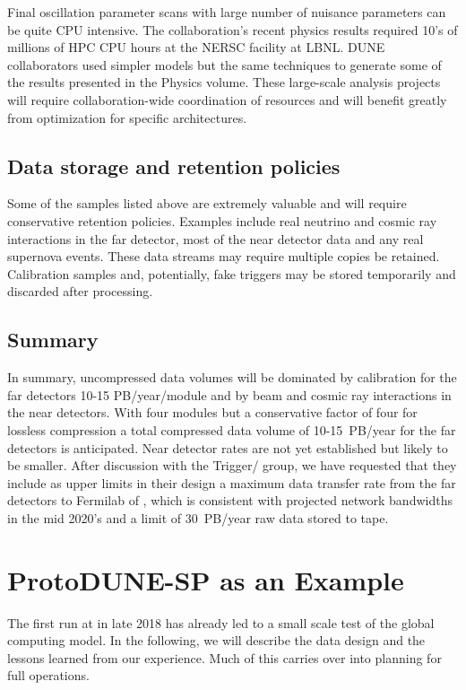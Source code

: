 Final oscillation parameter scans with large number of nuisance parameters can be quite CPU intensive.  The  collaboration's recent physics results required 10's of millions of  HPC CPU hours at the NERSC facility at LBNL. DUNE collaborators used simpler models but the same techniques to generate some of the results presented in the Physics volume. These large-scale analysis projects will require collaboration-wide coordination of resources and will benefit greatly from optimization for specific architectures.

\subsection{Data storage and retention policies}
Some of the samples listed above are extremely valuable and will require conservative retention policies.   Examples include real neutrino and cosmic ray interactions in the far detector, most of the near detector data and any real supernova events.  These data streams may require multiple copies be retained. Calibration samples and, potentially, fake  triggers may be stored temporarily and discarded after processing. 



\subsection{Summary}
In summary, uncompressed data volumes will be dominated by calibration for the far detectors 10-15 PB/year/module and by beam and cosmic ray interactions in the near detectors.  With four  modules but a conservative factor of four for lossless compression a total compressed data volume of 10-15~PB/year for the far detectors is anticipated. Near detector rates are not yet established but likely to be smaller.   
After discussion with the  Trigger/ group, we have requested that they include as upper limits in their design a  maximum data transfer rate from the far detectors to Fermilab of \surffnalbw, which is consistent with projected network bandwidths in the mid 2020's and a limit of 30~PB/year raw data stored to tape.  


\section{ProtoDUNE-SP as an Example}
\label{ch:exec-comp-proto-SP}
The first   run at  in late 2018 has already led to a small scale test of the global computing model.  In the following, we will describe the  data design and the lessons learned from our experience. Much of this carries over into planning for full  operations. 

